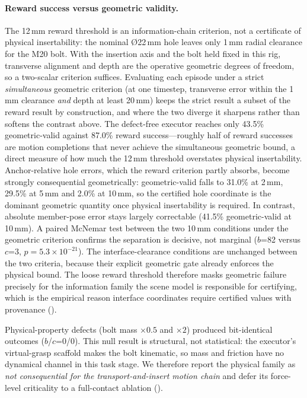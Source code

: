 \paragraph{Reward success versus geometric validity.}
The 12\,mm reward threshold is an information-chain criterion, not a
certificate of physical insertability: the nominal \O22\,mm hole leaves only
1\,mm radial clearance for the M20 bolt. With the insertion axis and the
bolt held fixed in this rig, transverse alignment and depth are the
operative geometric degrees of freedom, so a two-scalar criterion suffices.
Evaluating each episode under a
strict \emph{simultaneous} geometric criterion (at one timestep, transverse
error within the 1\,mm clearance \emph{and} depth at least 20\,mm) keeps the
strict result a subset of the reward result by construction, and where the
two diverge it sharpens rather than softens the contrast above. The
defect-free executor reaches only 43.5\% geometric-valid against 87.0\%
reward success---roughly half of reward successes are motion completions that
never achieve the simultaneous geometric bound, a direct measure of how much
the 12\,mm threshold overstates physical insertability. Anchor-relative hole
errors, which the reward criterion partly absorbs, become strongly
consequential geometrically: geometric-valid falls to 31.0\% at 2\,mm,
29.5\% at 5\,mm and 2.0\% at 10\,mm, so the certified hole coordinate is the
dominant geometric quantity once physical insertability is required. In
contrast, absolute member-pose error stays largely correctable (41.5\%
geometric-valid at 10\,mm). A paired McNemar test between the two 10\,mm
conditions under the geometric criterion confirms the separation is decisive,
not marginal ($b$=82 versus $c$=3, $p=5.3\times10^{-21}$). The
interface-clearance conditions are unchanged between the two criteria,
because their explicit geometric gate already enforces the physical bound.
The loose reward threshold therefore masks geometric failure precisely for
the information family the scene model is responsible for certifying, which
is the empirical reason interface coordinates require certified values with
provenance ().

Physical-property defects (bolt mass $\times0.5$ and $\times2$) produced
bit-identical outcomes ($b$/$c$=0/0). This null result is structural, not
statistical: the executor's virtual-grasp scaffold makes the bolt kinematic,
so mass and friction have no dynamical channel in this task stage. We
therefore report the physical family as \emph{not consequential for the
transport-and-insert motion chain} and defer its force-level criticality to a
full-contact ablation ().


